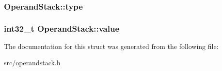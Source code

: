 \subsubsection[{\texorpdfstring{type}{type}}]{ Operand\+Stack\+::type}\hypertarget{structOperandStack_ad7a4540e55819de1b5cebd7fd037764a}{}\label{structOperandStack_ad7a4540e55819de1b5cebd7fd037764a}
\subsubsection[{\texorpdfstring{value}{value}}]{\setlength{\rightskip}{0pt plus 5cm}int32\+\_\+t Operand\+Stack\+::value}\hypertarget{structOperandStack_a931d181370bfdb5b41edb8fe488c3b90}{}\label{structOperandStack_a931d181370bfdb5b41edb8fe488c3b90}


The documentation for this struct was generated from the following file\+:\begin{DoxyCompactItemize}
\item 
src/\hyperlink{operandstack_8h}{operandstack.\+h}\end{DoxyCompactItemize}
